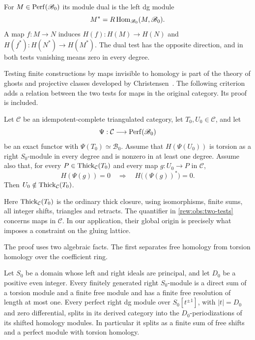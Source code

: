 For $M\in\operatorname{Perf}(\mathscr B_0)$ its module dual is the left dg module
\[
 M^*=R\operatorname{Hom}_{\mathscr B_0}(M,\mathscr B_0).
\]
A map $f:M\to N$ induces
$H(f):H(M)\to H(N)$ and
$H(f^*):H(N^*)\to H(M^*)$.  The dual test has the opposite
direction, and in both tests vanishing means zero in every degree.

Testing finite constructions by maps invisible to homology is part
of the theory of ghosts and projective classes developed by
Christensen~\cite[Theorem~3.5 and Section~8]{Christensen1998}.
The following criterion adds a relation between the two tests for
maps in the original category.  Its proof is included.

\begin{theorem}
\label{rew:obs:tower-criterion}
Let $\mathcal C$ be an idempotent-complete triangulated category,
let $T_0,U_0\in\mathcal C$, and let
\[
 \Psi:\mathcal C\longrightarrow\operatorname{Perf}(\mathscr B_0)
\]
be an exact functor with $\Psi(T_0)\simeq\mathscr B_0$.  Assume that
$H(\Psi(U_0))$ is torsion as a right $S_0$-module in every degree
and is nonzero in at least one degree.  Assume also that, for every
$P\in\operatorname{Thick}_{\mathcal C}(T_0)$ and every map $g:U_0\to P$ in
$\mathcal C$,
\begin{equation}
\label{rew:obs:two-tests}
 H(\Psi(g))=0
 \quad\Longrightarrow\quad
 H\bigl((\Psi(g))^*\bigr)=0.
\end{equation}
Then $U_0\notin\operatorname{Thick}_{\mathcal C}(T_0)$.
\end{theorem}

Here $\operatorname{Thick}_{\mathcal C}(T_0)$ is the ordinary thick closure,
using isomorphisms, finite sums, all integer shifts, triangles
and retracts.
The quantifier in \eqref{rew:obs:two-tests} concerns maps in
$\mathcal C$.  In our application, their global origin is precisely
what imposes a constraint on the gluing lattice.

The proof uses two algebraic facts.  The first separates free
homology from torsion homology over the coefficient ring.

\begin{lemma}
\label{obs:periodic-splitting}
Let $S_0$ be a domain whose left and right ideals are principal, and
let $D_0$ be a positive even integer.  Every finitely generated right
$S_0$-module is a direct sum of a torsion module and a finite free
module and has a finite free resolution of length at most one.
Every perfect right dg module over
$S_0[t^{\pm1}]$, with $|t|=D_0$ and zero differential, splits in its
derived category into the $D_0$-periodizations of its shifted homology
modules.  In particular it splits as a finite sum of free shifts and
a perfect module with torsion homology.
\end{lemma}

